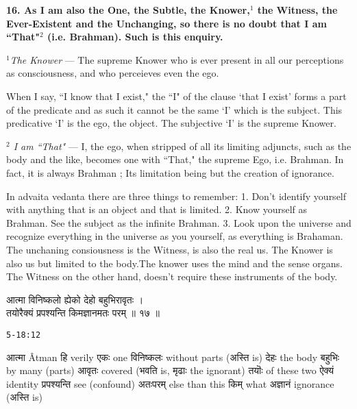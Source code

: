 \documentclass{article}
\begin{document}
\bigskip

\textbf{ 16. As I am also the One, the Subtle, the Knower,$^1$ the Witness, the
Ever-Existent and the Unchanging, so there is no doubt that I am ``That"$^2$
(i.e. Brahman). Such is this enquiry.  }

{\small \textit{$^1$The Knower} --- The supreme Knower who is ever present in
all our perceptions as consciousness, and who perceieves even the ego.

When I say, ``I know that I exist," the ``I" of the clause `that I exist' forms
a part of the predicate and as such it cannot be the same `I' which is the
subject. This predicative `I' is the ego, the object. The subjective `I' is the
supreme Knower.

\textit{$^2$ I am ``That"} --- I, the ego, when stripped of all its limiting
adjuncts, such as the body and the like, becomes one with ``That," the supreme
Ego, i.e. Brahman. In fact, it is always Brahman ; Its limitation being but the
creation of ignorance.  }

\begin{oframed}

    In advaita vedanta there are three things to remember: 1. Don't identify
    yourself with anything that is an object and that is limited. 2.  Know
    yourself as Brahman. See the subject as the infinite Brahman. 3. Look upon
    the universe and recognize everything in the universe as you yourself, as
    everything is Brahaman.  The unchaning consiousness is the Witness, is also
    the real us. The Knower is also us but limited to the body.The knower uses
    the mind and the sense organs. The Witness on the other hand, doesn't
    require these instruments of the body.

\end{oframed}

\begin{large}
\begin{center}
    \begin{hindi}

आत्मा विनिष्कलो ह्येको देहो बहुभिरावृतः ।\\
तयोरैक्यं प्रपश्यन्ति किमज्ञानमतः परम् ॥ १७ ॥
    \end{hindi}
\end{center}
\end{large}
\texttt{5-18:12}

\texthindi{आत्मा}
Âtman
\texthindi{हि}
verily
\texthindi{एकः}
one
\texthindi{विनिष्कलः}
without parts
(\texthindi{अस्ति}
is)
\texthindi{देहः}
the body
\texthindi{बहुभिः}
by many (parts)
\texthindi{आवृतः}
covered
(\texthindi{भवति}
is,
\texthindi{मृढाः}
the ignorant)
\texthindi{तयॊः}
of these two
\texthindi{ऐक्यं}
identity
\texthindi{प्रपश्यन्ति}
see (confound)
\texthindi{अतःपरम्}
else than this
\texthindi{किम्}
what
\texthindi{अज्ञानं}
ignorance
(\texthindi{अस्ति}
is)
\end{document}
